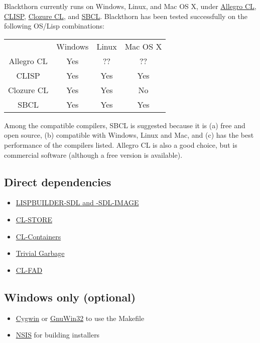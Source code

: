 \documentclass[letterpaper]{article}
\begin{document}
Blackthorn currently runs on Windows, Linux, and Mac OS X, under \href{http://franz.com/products/allegrocl/}{Allegro CL}, \href{http://clisp.cons.org/}{CLISP}, \href{http://trac.clozure.com/openmcl}{Clozure CL}, and \href{http://www.sbcl.org/}{SBCL}. Blackthorn has been tested successfully on the following OS/Lisp combinations:

\begin{tabular}{c c c c}
           & Windows & Linux & Mac OS X \\
Allegro CL & Yes     & ??    & ?? \\
CLISP      & Yes     & Yes   & Yes \\
Clozure CL & Yes     & Yes   & No \\
SBCL       & Yes     & Yes   & Yes \\
\end{tabular}

Among the compatible compilers, SBCL is suggested because it is (a) free and open source, (b) compatible with Windows, Linux and Mac, and (c) has the best performance of the compilers listed. Allegro CL is also a good choice, but is commercial software (although a free version is available).

\subsection{Direct dependencies}

\begin{itemize}
    \item \href{http://code.google.com/p/lispbuilder/}{LISPBUILDER-SDL and -SDL-IMAGE}
    \item \href{http://common-lisp.net/project/cl-store/}{CL-STORE}
    \item \href{http://www.common-lisp.org/project/cl-containers/}{CL-Containers}
    \item \href{http://www.cliki.net/trivial-garbage}{Trivial Garbage}
    \item \href{http://www.weitz.de/cl-fad/}{CL-FAD}
\end{itemize}

\subsection{Windows only (optional)}

\begin{itemize}
    \item \href{http://www.cygwin.com/}{Cygwin} or \href{http://gnuwin32.sourceforge.net/}{GnuWin32} to use the Makefile
    \item \href{http://nsis.sourceforge.net/}{NSIS} for building installers
\end{itemize}
\end{document}
